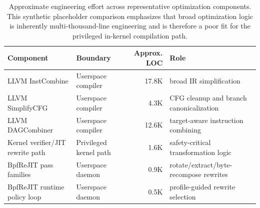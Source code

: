 \begin{table}[t]
  \centering
  \caption{Approximate engineering effort across representative optimization components. This synthetic placeholder comparison emphasizes that broad optimization logic is inherently multi-thousand-line engineering and is therefore a poor fit for the privileged in-kernel compilation path.}
  \label{tab:motivation-effort}
  \scriptsize
  \begin{tabular}{p{1.85cm}p{1.5cm}rp{1.85cm}}
    \toprule
    Component & Boundary & Approx. LOC & Role \\
    \midrule
    LLVM InstCombine & Userspace compiler & 17.8K & broad IR simplification \\
    LLVM SimplifyCFG & Userspace compiler & 4.3K & CFG cleanup and branch canonicalization \\
    LLVM DAGCombiner & Userspace compiler & 12.6K & target-aware instruction combining \\
    Kernel verifier/JIT rewrite path & Privileged kernel path & 1.6K & safety-critical transformation logic \\
    BpfReJIT pass families & Userspace daemon & 0.9K & rotate/extract/byte-recompose rewrites \\
    BpfReJIT runtime policy loop & Userspace daemon & 0.5K & profile-guided rewrite selection \\
    \bottomrule
  \end{tabular}
\end{table}
